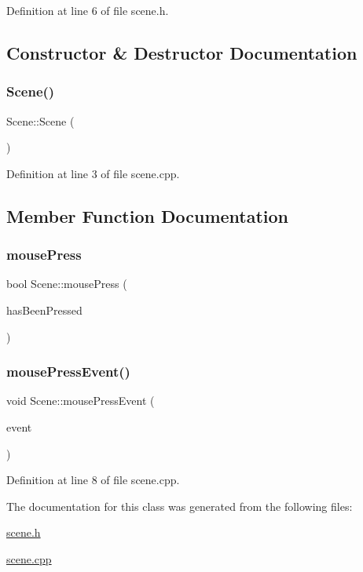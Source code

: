 Definition at line 6 of file scene.\+h.



\subsection{Constructor \& Destructor Documentation}
\mbox{\label{class_scene_ad10176d75a9cc0da56626f682d083507}} 
\subsubsection{\texorpdfstring{Scene()}{Scene()}}
{\footnotesize\ttfamily Scene\+::\+Scene (\begin{DoxyParamCaption}{ }\end{DoxyParamCaption})}



Definition at line 3 of file scene.\+cpp.



\subsection{Member Function Documentation}
\mbox{\label{class_scene_a393b0ed4e907779249e2857d3b93a5f1}} 
\subsubsection{\texorpdfstring{mouse\+Press}{mousePress}}
{\footnotesize\ttfamily bool Scene\+::mouse\+Press (\begin{DoxyParamCaption}\item[{bool}]{has\+Been\+Pressed }\end{DoxyParamCaption})\hspace{0.3cm}{\ttfamily [signal]}}

\mbox{\label{class_scene_af86554e49d701f3fe9f0ac4f568f7113}} 
\subsubsection{\texorpdfstring{mouse\+Press\+Event()}{mousePressEvent()}}
{\footnotesize\ttfamily void Scene\+::mouse\+Press\+Event (\begin{DoxyParamCaption}\item[{Q\+Mouse\+Event $\ast$}]{event }\end{DoxyParamCaption})\hspace{0.3cm}{\ttfamily [protected]}}



Definition at line 8 of file scene.\+cpp.



The documentation for this class was generated from the following files\+:\begin{DoxyCompactItemize}
\item 
\mbox{\hyperlink{scene_8h}{scene.\+h}}\item 
\mbox{\hyperlink{scene_8cpp}{scene.\+cpp}}\end{DoxyCompactItemize}
